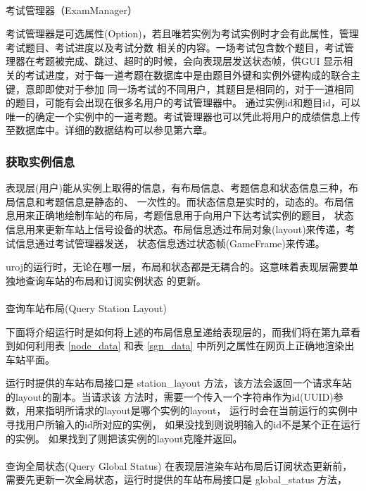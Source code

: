 \paragraph{}考试管理器（ExamManager）

考试管理器是可选属性(Option)，若且唯若实例为考试实例时才会有此属性，管理考试题目、考试进度以及考试分数
相关的内容。一场考试包含数个题目，考试管理器在考题被完成、跳过、超时的时候，会向表现层发送状态帧，供GUI
显示相关的考试进度，对于每一道考题在数据库中是由题目外键和实例外键构成的联合主键，意即即使对于参加
同一场考试的不同用户，其题目是相同的，对于一道相同的题目，可能有会出现在很多名用户的考试管理器中。
通过实例id和题目id，可以唯一的确定一个实例中的一道考题。考试管理器也可以凭此将用户的成绩信息上传
至数据库中。详细的数据结构可以参见第六章。

\subsubsection{获取实例信息}
表现层(用户)能从实例上取得的信息，有布局信息、考题信息和状态信息三种，布局信息和考题信息是静态的、
一次性的。而状态信息是实时的，动态的。布局信息用来正确地绘制车站的布局，考题信息用于向用户下达考试实例的题目，
状态信息用来更新车站上信号设备的状态。布局信息透过布局对象(layout)来传递，考试信息通过考试管理器发送，
状态信息透过状态帧(GameFrame)来传递。

uroj的运行时，无论在哪一层，布局和状态都是无耦合的。这意味着表现层需要单独地查询车站的布局和订阅实例状态
的更新。

\paragraph{}查询车站布局(Query Station Layout)

下面将介绍运行时是如何将上述的布局信息呈递给表现层的，而我们将在第九章看到如何利用表 \ref{node_data}
和表 \ref{sgn_data} 中所列之属性在网页上正确地渲染出车站平面。

运行时提供的车站布局接口是 station\_layout 方法，该方法会返回一个请求车站的layout的副本。当请求该
方法时，需要一个传入一个字符串作为id(UUID)参数，用来指明所请求的layout是哪个实例的layout，
运行时会在当前运行的实例中寻找用户所输入的id所对应的实例，
如果没找到则说明输入的id不是某个正在运行的实例。
如果找到了则把该实例的layout克隆并返回。

\paragraph{}查询全局状态(Query Global Status)
在表现层渲染车站布局后订阅状态更新前，需要先更新一次全局状态，运行时提供的车站布局接口是 global\_status 方法，

